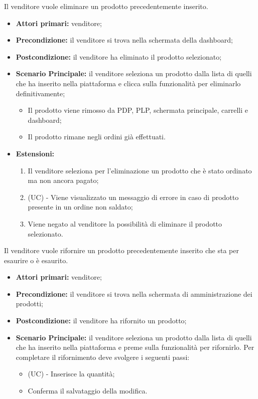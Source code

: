 Il venditore vuole eliminare un prodotto precedentemente inserito.
\begin{itemize}
    \item \textbf{Attori primari:} venditore;
    \item \textbf{Precondizione:} il venditore si trova nella schermata della dashboard;
    \item \textbf{Postcondizione:} il venditore ha eliminato il prodotto selezionato;
    \item \textbf{Scenario Principale:} il venditore seleziona un prodotto dalla lista di quelli che ha inserito nella piattaforma e clicca sulla funzionalità per eliminarlo definitivamente;
    \begin{itemize}
    	\item Il prodotto viene rimosso da PDP, PLP, schermata principale, carrelli e dashboard;
    	\item Il prodotto rimane negli ordini già effettuati.
    \end{itemize}
    \item \textbf{Estensioni:}
    \begin{enumerate}[label=\lett]
    	\item Il venditore seleziona per l'eliminazione un prodotto che è stato ordinato ma non ancora pagato;
    	\item (UC) - Viene visualizzato un messaggio di errore in caso di prodotto presente in un ordine non saldato;
    	\item Viene negato al venditore la possibilità di eliminare il prodotto selezionato.
    \end{enumerate}
\end{itemize}

Il venditore vuole rifornire un prodotto precedentemente inserito che sta per esaurire o è esaurito.
\begin{itemize}
    \item \textbf{Attori primari:} venditore;
    \item \textbf{Precondizione:} il venditore si trova nella schermata di amministrazione dei prodotti;
    \item \textbf{Postcondizione:} il venditore ha rifornito un prodotto;
    \item \textbf{Scenario Principale:} il venditore seleziona un prodotto dalla lista di quelli che ha inserito nella piattaforma e preme sulla funzionalità per rifornirlo. Per completare il rifornimento deve svolgere i seguenti passi:
    \begin{itemize}
        \item (UC) - Inserisce la quantità;
        \item Conferma il salvataggio della modifica.
    \end{itemize}
\end{itemize}

